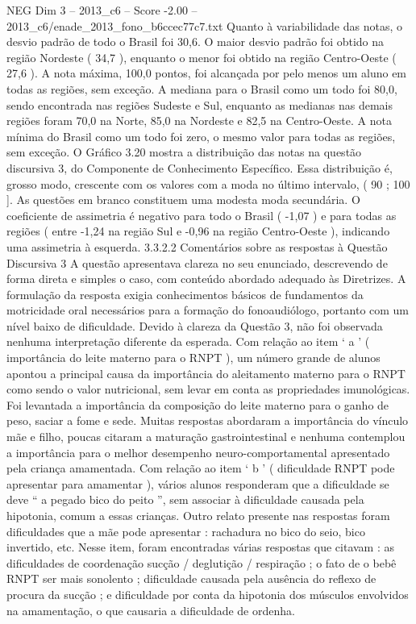 \begin{textsample}{NEG Dim 3 – 2013\_c6 – Score -2.00 – 2013\_c6/enade\_2013\_fono\_b6ccec77c7.txt}
Quanto à variabilidade das notas, o desvio padrão de todo o Brasil foi 30,6.
O maior desvio padrão foi obtido na região Nordeste ( 34,7 ), enquanto o menor foi obtido na região Centro-Oeste ( 27,6 ).
A nota máxima, 100,0 pontos, foi alcançada por pelo menos um aluno em todas as regiões, sem exceção.
A mediana para o Brasil como um todo foi 80,0, sendo encontrada nas regiões Sudeste e Sul, enquanto as medianas nas demais regiões foram 70,0 na Norte, 85,0 na Nordeste e 82,5 na Centro-Oeste.
A nota mínima do Brasil como um todo foi zero, o mesmo valor para todas as regiões, sem exceção.
O Gráfico 3.20 mostra a distribuição das notas na questão discursiva 3, do Componente de Conhecimento Específico.
Essa distribuição é, grosso modo, crescente com os valores com a moda no último intervalo, ( 90 ; 100 ].
As questões em branco constituem uma modesta moda secundária.
O coeficiente de assimetria é negativo para todo o Brasil ( -1,07 ) e para todas as regiões ( entre -1,24 na região Sul e -0,96 na região Centro-Oeste ), indicando uma assimetria à esquerda. 3.3.2.2 Comentários sobre as respostas à Questão Discursiva 3 A questão apresentava clareza no seu enunciado, descrevendo de forma direta e simples o caso, com conteúdo abordado adequado às Diretrizes.
A formulação da resposta exigia conhecimentos básicos de fundamentos da motricidade oral necessários para a formação do fonoaudiólogo, portanto com um nível baixo de dificuldade.
Devido à clareza da Questão 3, não foi observada nenhuma interpretação diferente da esperada.
Com relação ao item ‘ a ’ ( importância do leite materno para o RNPT ), um número grande de alunos apontou a principal causa da importância do aleitamento materno para o RNPT como sendo o valor nutricional, sem levar em conta as propriedades imunológicas.
Foi levantada a importância da composição do leite materno para o ganho de peso, saciar a fome e sede.
Muitas respostas abordaram a importância do vínculo mãe e filho, poucas citaram a maturação gastrointestinal e nenhuma contemplou a importância para o melhor desempenho neuro-comportamental apresentado pela criança amamentada.
Com relação ao item ‘ b ’ ( dificuldade RNPT pode apresentar para amamentar ), vários alunos responderam que a dificuldade se deve “ a pegado bico do peito ”, sem associar à dificuldade causada pela hipotonia, comum a essas crianças.
Outro relato presente nas respostas foram dificuldades que a mãe pode apresentar : rachadura no bico do seio, bico invertido, etc.
Nesse item, foram encontradas várias respostas que citavam : as dificuldades de coordenação sucção / deglutição / respiração ; o fato de o bebê RNPT ser mais sonolento ; dificuldade causada pela ausência do reflexo de procura da sucção ; e dificuldade por conta da hipotonia dos músculos envolvidos na amamentação, o que causaria a dificuldade de ordenha.

\end{textsample}
